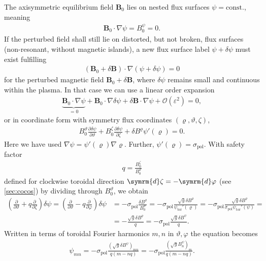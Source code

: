 \documentclass[a4paper, 10pt, english]{article}
\let\temp\varrho
\let\varrho\rho
\let\rho\temp
\let\temp\vartheta
\let\vartheta\theta
\let\theta\temp
\let\temp\varphi
\let\varphi\phi
\let\phi\temp
\let\vec\symbf
\newcommand*\diff{\ensuremath{\symrm{d}}}  %
\newcommand*\pd[2][]{\ensuremath{\frac{\partial #1}{\partial #2}}}  %
\newcommand*\pol{\ensuremath{\textrm{pol}}}  %
\newcommand*\tor{\ensuremath{\textrm{tor}}}  %
\begin{document}
The axisymmetric equilibrium field $\vec{B}_{0}$ lies on nested flux surfaces $\psi = \text{const.}$, meaning
\begin{gather*}
  \vec{B}_{0} \cdot \nabla \psi = B_{0}^{\psi} = 0.
\end{gather*}
If the perturbed field shall still lie on distorted, but not broken, flux surfaces (non-resonant, without magnetic islands), a new flux surface label $\psi + \delta \psi$ must exist fulfilling
\begin{gather*}
  (\vec{B}_{0} + \delta \vec{B}) \cdot \nabla (\psi + \delta \psi) = 0
\end{gather*}
for the perturbed magnetic field $\vec{B}_{0} + \delta \vec{B}$, where $\delta \psi$ remains small and continuous within the plasma. In that case we can use a linear order expansion
\begin{gather*}
  \underbrace{\vec{B}_{0} \cdot \nabla \psi}_{= 0} + \vec{B}_{0} \cdot \nabla \delta \psi + \delta \vec{B} \cdot \nabla \psi + \mathcal{O}(\varepsilon^{2}) = 0,
\end{gather*}
or in coordinate form with symmetry flux coordinates $(\rho, \theta, \zeta)$,
\begin{gather*}
  B_{0}^{\theta} \pd[\delta \psi]{\theta} + B_{0}^{\zeta} \pd[\delta \psi]{\zeta} + \delta B^{\rho} \psi' (\rho) = 0.
\end{gather*}
Here we have used $\nabla \psi = \psi' (\rho) \nabla \rho$. Further, $\psi' (\rho) = \sigma_{\pol}$. With safety factor
\begin{gather*}
  q = \frac{B_{0}^{\zeta}}{B_{0}^{\theta}}
\end{gather*}
defined for clockwise toroidal direction $\diff \zeta = -\diff \phi$ (see \cref{sec:cocos}) by dividing through $B_{0}^{\theta}$, we obtain
\begin{align*}
  \left( \pd{\theta} + q \pd{\zeta} \right) \delta \psi = \left( \pd{\theta} - q \pd{\phi} \right) \delta \psi &= -\sigma_{\pol} \frac{\delta B^{\rho}}{B_{0}^{\theta}} = -\sigma_{\pol} \frac{\sqrt{g} \delta B^{\rho}}{\psi_{\tor}' (\rho)} = -\sigma_{\pol} \frac{\sqrt{g} \delta B^{\rho}}{\sigma_{\pol} \psi_{\tor}' (\psi)} = \\
  &= -\frac{\sqrt{g} \delta B^{\rho}}{q} = -\sigma_{\pol} \frac{\sqrt{g} \delta B^{\psi}}{q}.
\end{align*}
Written in terms of toroidal Fourier harmonics $m, n$ in $\theta, \phi$ the equation becomes
\begin{gather*}
  \psi_{m n} = -\sigma_{\pol} \frac{\left( \sqrt{g} \delta B^{\psi} \right)_{m n}}{q (m - n q)} = -\sigma_{\pol} \frac{\left( \sqrt{g} B_{n}^{\psi} \right)_{m}}{q (m - n q)}.
\end{gather*}
\end{document}

